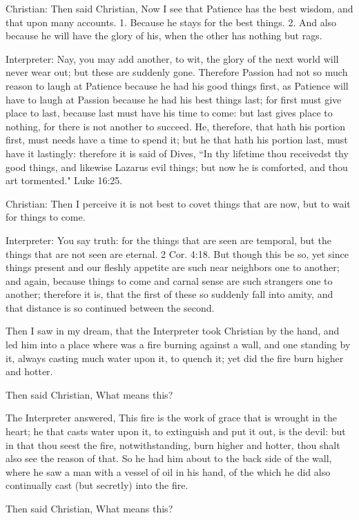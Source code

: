 Christian: Then said Christian, Now I see that Patience has the best wisdom, and that upon many accounts. 1. Because he stays for the best things. 2. And also because he will have the glory of his, when the other has nothing but rags.

Interpreter: Nay, you may add another, to wit, the glory of the next world will never wear out; but these are suddenly gone. Therefore Passion had not so much reason to laugh at Patience because he had his good things first, as Patience will have to laugh at Passion because he had his best things last; for first must give place to last, because last must have his time to come: but last gives place to nothing, for there is not another to succeed. He, therefore, that hath his portion first, must needs have a time to spend it; but he that hath his portion last, must have it lastingly: therefore it is said of Dives, ``In thy lifetime thou receivedst thy good things, and likewise Lazarus evil things; but now he is comforted, and thou art tormented." Luke 16:25.

Christian: Then I perceive it is not best to covet things that are now, but to wait for things to come.

Interpreter: You say truth: for the things that are seen are temporal, but the things that are not seen are eternal. 2 Cor. 4:18. But though this be so, yet since things present and our fleshly appetite are such near neighbors one to another; and again, because things to come and carnal sense are such strangers one to another; therefore it is, that the first of these so suddenly fall into amity, and that distance is so continued between the second.

Then I saw in my dream, that the Interpreter took Christian by the hand, and led him into a place where was a fire burning against a wall, and one standing by it, always casting much water upon it, to quench it; yet did the fire burn higher and hotter.

Then said Christian, What means this?

The Interpreter answered, This fire is the work of grace that is wrought in the heart; he that casts water upon it, to extinguish and put it out, is the devil: but in that thou seest the fire, notwithstanding, burn higher and hotter, thou shalt also see the reason of that. So he had him about to the back side of the wall, where he saw a man with a vessel of oil in his hand, of the which he did also continually cast (but secretly) into the fire.

Then said Christian, What means this?

